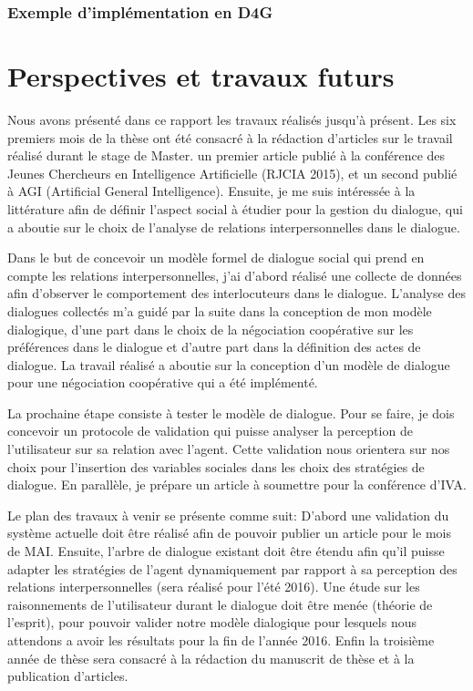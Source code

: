 \documentclass[a4paper,french]{article}
\begin{document}
\subsubsection{Exemple d'implémentation en D4G}


\section{Perspectives et travaux futurs}
\label{pers}

Nous avons présenté dans ce rapport les travaux réalisés jusqu'à présent. Les six premiers mois de la thèse ont été consacré à la rédaction d'articles sur le travail réalisé durant le stage de Master. un premier article \cite{ouali2015reparation} publié à la conférence des Jeunes Chercheurs en Intelligence Artificielle (RJCIA 2015), et un second \cite{ouali2015plan} publié à AGI (Artificial General Intelligence). Ensuite, je me suis intéressée à la littérature afin de définir l'aspect social à étudier pour la gestion du dialogue, qui a aboutie sur le choix de l'analyse de relations interpersonnelles dans le dialogue. 

\par Dans le but de concevoir un modèle formel de dialogue social qui prend en compte les relations interpersonnelles, j'ai d'abord réalisé une collecte de données afin d’observer le comportement des interlocuteurs dans le dialogue. L'analyse des dialogues collectés m'a guidé par la suite dans la conception de mon modèle dialogique, d'une part dans le choix de la négociation coopérative sur les préférences dans le dialogue et d'autre part dans la définition des actes de dialogue.  La travail réalisé a aboutie sur la conception d'un modèle de dialogue pour une négociation coopérative qui a été implémenté. 

\par La prochaine étape consiste à tester le modèle de dialogue. Pour se faire, je dois concevoir un protocole de validation qui puisse analyser la perception de l'utilisateur sur sa relation avec l'agent. Cette validation nous orientera sur nos choix pour l'insertion des variables sociales dans les choix des stratégies de dialogue. En parallèle, je prépare un article à soumettre pour la conférence d'IVA. 

\par Le plan des travaux à venir se présente comme suit: D'abord une validation du système actuelle doit être réalisé afin de pouvoir publier un article pour le mois de MAI. 
Ensuite, l'arbre de dialogue existant doit être étendu afin qu'il puisse adapter les stratégies de l'agent dynamiquement par rapport à sa perception des relations interpersonnelles (sera réalisé pour l'été 2016). Une étude sur les raisonnements de l'utilisateur durant le dialogue doit être menée (théorie de l'esprit), pour pouvoir valider notre modèle dialogique pour lesquels nous attendons a avoir les résultats pour la fin de l'année 2016.
Enfin la troisième année de thèse sera consacré à la rédaction du manuscrit de thèse et à la publication d'articles.


	\vskip 4pt
	
	{\footnotesize
			} %
	
\end{document}

